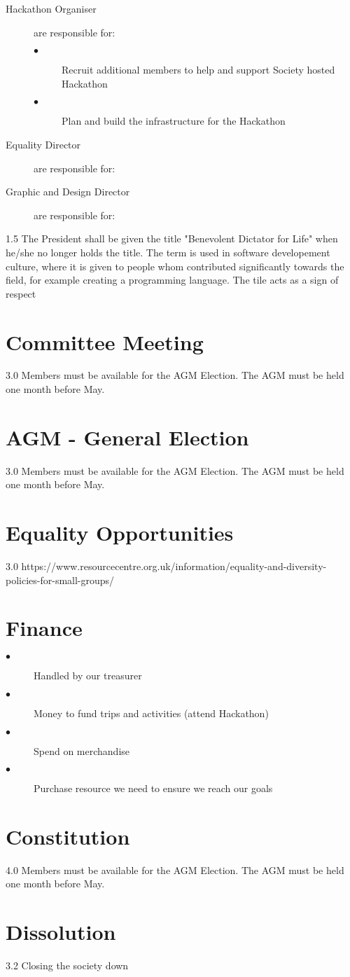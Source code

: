 \documentclass{report}
\begin{document}
\begin{description}
    \item[Hackathon Organiser] are responsible for: 
      \begin{description}
        \item[$\bullet$] Recruit additional members to help and support Society hosted
        Hackathon
        \item[$\bullet$] Plan and build the infrastructure for the Hackathon
      \end{description}

    \item[Equality Director] are responsible for: 
    \item[Graphic and Design Director] are responsible for:
    \item[]

  \end{description}

  1.5 The President shall be given the title "Benevolent Dictator for Life" when he/she no
  longer holds the title. 
  The term is used in software developement culture, where it is given to people 
  whom contributed significantly towards the field, for example creating a
  programming language. The tile acts as a sign of respect 
  
  \section{Committee Meeting}
  3.0 Members must be available for the AGM Election. The AGM must be held one month before May.
  
  \section{AGM - General Election}
  3.0 Members must be available for the AGM Election. The AGM must be held one month before May.
  
  
  \section{Equality Opportunities}
  3.0 https://www.resourcecentre.org.uk/information/equality-and-diversity-policies-for-small-groups/
  
  \section{Finance}
  \begin{description}
    \item[$\bullet$] Handled by our treasurer
    \item[$\bullet$] Money to fund trips and activities (attend Hackathon)
    \item[$\bullet$] Spend on merchandise
    \item[$\bullet$] Purchase resource we need to ensure we reach our goals
  \end{description}
  
  \section{Constitution}
  4.0 Members must be available for the AGM Election. The AGM must be held one month before May.
  
  
  \section{Dissolution}
  3.2 Closing the society down
  
  
\end{document}
